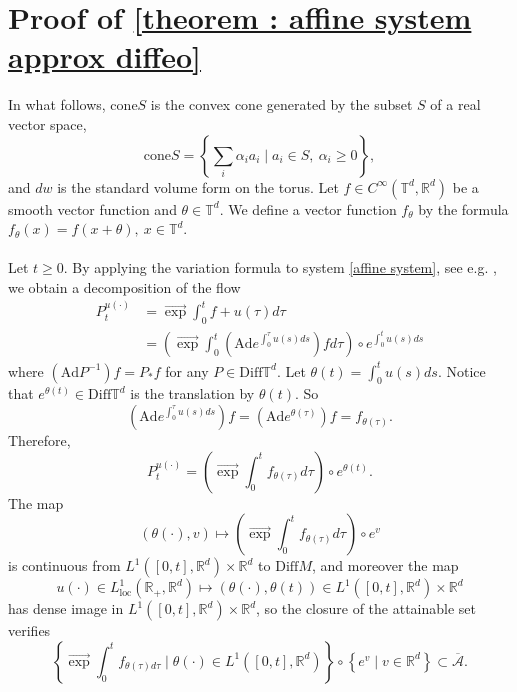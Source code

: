 \documentclass[10pt]{article}
\newcommand{\R}{{\mathbb R}}
\newcommand{\T}{{\mathbb T}}
\newcommand{\ov}{\overline}
\newcommand{\Ad}{\text{Ad}}
\newcommand{\f}{\overrightarrow}
\begin{document}
\section{Proof of \cref{theorem : affine system approx diffeo}}

In what follows, $\mathrm{cone}S$ is the convex cone generated by the subset $S$ of a real vector space,
\begin{equation*}
    \mathrm{cone}S=\left\{\sum_i\alpha_ia_i \mid a_i\in S,\ \alpha_i\ge 0\right\},
\end{equation*} 
and $dw$ is the standard volume form on the torus. Let $f\in C^\infty(\T^d,\R^d)$ be a smooth vector function and $\theta\in\T^d$. We define a vector function $f_\theta$ by the formula
$f_\theta(x)=f(x+\theta),\ x\in\T^d$.
\\ \\
Let $t\geq 0$. By applying the variation formula to system \eqref{affine system}, see e.g. \cite[Section 2.7]{AgSa}, we obtain a decomposition of the flow
\begin{align*}
    P_t^{u(\cdot)}&=\f{\exp}\int_0^tf+u(\tau)d\tau \\
    &=\left(\f{\exp}\int_{0}^t \left(\Ad e^{\int_0^\tau u(s)ds}\right)fd\tau \right)\circ e^{\int_0^tu(s)ds} 
\end{align*}
where $(\Ad P^{-1})f=P_{*}f$ for any $P \in \mathrm{Diff} \T^d$. 
Let  $\theta(t)=\int_0^tu(s)ds$. Notice that $e^{\theta(t)}\in \mathrm{Diff} \T^d$ is the translation by $\theta(t)$. So
$$\left(\Ad e^{\int_0^\tau u(s)ds}\right)f=(\Ad e^{\theta(\tau)}) f=f_{\theta(\tau)}.$$Therefore, $$P_t^{u(\cdot)}=\left(\f{\exp}\int_0^t f_{\theta(\tau)}d\tau\right) \circ e^{\theta(t)}.$$
The map 
\begin{equation*}
    (\theta(\cdot),v) \mapsto \left(\f{\exp}\int_0^tf_{\theta(\tau)}d\tau \right)\circ e^v
\end{equation*}
is continuous from $L^1([0,t],\R^d)\times \R^d$ to $\mathrm{Diff}M$, and moreover the map 
\begin{equation}
    u(\cdot)\in L^1_{\mathrm{loc}}(\R_+,\R^d)\mapsto (\theta(\cdot),\theta(t))\in L^1([0,t],\R^d)\times \R^d
\end{equation}
has dense image in $L^1([0,t],\R^d)\times \R^d$, so the closure of the attainable set verifies 
\begin{equation*}
\left\{\f{\exp}\int_0^tf_{\theta(\tau)d\tau}\mid \theta(\cdot)\in L^1([0,t],\R^d)\right\}\circ\left\{e^v \mid v \in \R^d\right\}\subset \ov{\mathcal{A}}.
\end{equation*}
\end{document}
